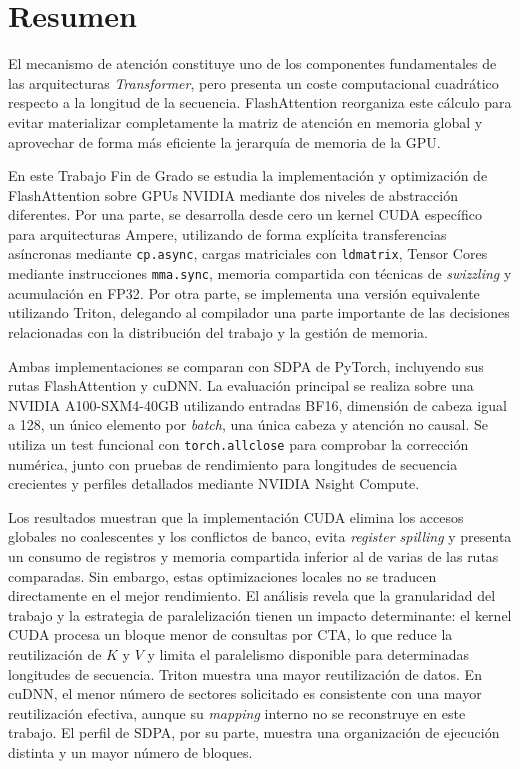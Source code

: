 \renewcommand{\keywords}[1]{\par\vspace{1em}{\itshape\bfseries Palabras clave -- }#1}

\chapter*{Resumen}

El mecanismo de atención constituye uno de los componentes fundamentales de las arquitecturas \textit{Transformer}, pero presenta un coste computacional cuadrático respecto a la longitud de la secuencia. FlashAttention reorganiza este cálculo para evitar materializar completamente la matriz de atención en memoria global y aprovechar de forma más eficiente la jerarquía de memoria de la GPU.

En este Trabajo Fin de Grado se estudia la implementación y optimización de FlashAttention sobre GPUs NVIDIA mediante dos niveles de abstracción diferentes. Por una parte, se desarrolla desde cero un kernel CUDA específico para arquitecturas Ampere, utilizando de forma explícita transferencias asíncronas mediante \texttt{cp.async}, cargas matriciales con \texttt{ldmatrix}, Tensor Cores mediante instrucciones \texttt{mma.sync}, memoria compartida con técnicas de \textit{swizzling} y acumulación en FP32. Por otra parte, se implementa una versión equivalente utilizando Triton, delegando al compilador una parte importante de las decisiones relacionadas con la distribución del trabajo y la gestión de memoria.

Ambas implementaciones se comparan con SDPA de PyTorch, incluyendo sus rutas FlashAttention y cuDNN. La evaluación principal se realiza sobre una NVIDIA A100-SXM4-40GB utilizando entradas BF16, dimensión de cabeza igual a 128, un único elemento por \textit{batch}, una única cabeza y atención no causal. Se utiliza un test funcional con \texttt{torch.allclose} para comprobar la corrección numérica, junto con pruebas de rendimiento para longitudes de secuencia crecientes y perfiles detallados mediante NVIDIA Nsight Compute.

Los resultados muestran que la implementación CUDA elimina los accesos globales no coalescentes y los conflictos de banco, evita \textit{register spilling} y presenta un consumo de registros y memoria compartida inferior al de varias de las rutas comparadas. Sin embargo, estas optimizaciones locales no se traducen directamente en el mejor rendimiento. El análisis revela que la granularidad del trabajo y la estrategia de paralelización tienen un impacto determinante: el kernel CUDA procesa un bloque menor de consultas por CTA, lo que reduce la reutilización de \(K\) y \(V\) y limita el paralelismo disponible para determinadas longitudes de secuencia. Triton muestra una mayor reutilización de datos. En cuDNN, el menor número de sectores solicitado es consistente con una mayor reutilización efectiva, aunque su \textit{mapping} interno no se reconstruye en este trabajo. El perfil de SDPA, por su parte, muestra una organización de ejecución distinta y un mayor número de bloques.

